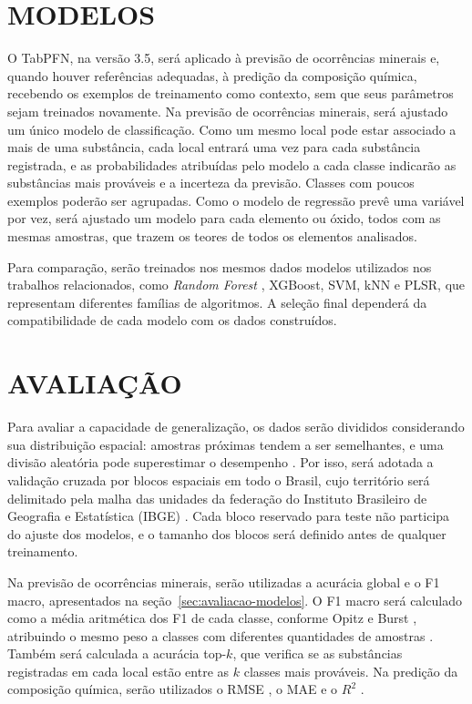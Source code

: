 \section{MODELOS}

O TabPFN, na versão 3.5, será aplicado à previsão de ocorrências minerais e, quando houver referências adequadas, à predição da composição química, recebendo os exemplos de treinamento como contexto, sem que seus parâmetros sejam treinados novamente. Na previsão de ocorrências minerais, será ajustado um único modelo de classificação. Como um mesmo local pode estar associado a mais de uma substância, cada local entrará uma vez para cada substância registrada, e as probabilidades atribuídas pelo modelo a cada classe indicarão as substâncias mais prováveis e a incerteza da previsão. Classes com poucos exemplos poderão ser agrupadas. Como o modelo de regressão prevê uma variável por vez, será ajustado um modelo para cada elemento ou óxido, todos com as mesmas amostras, que trazem os teores de todos os elementos analisados.

Para comparação, serão treinados nos mesmos dados modelos utilizados nos trabalhos relacionados, como \textit{Random Forest} \cite{breiman2001}, XGBoost, SVM, kNN e PLSR, que representam diferentes famílias de algoritmos. A seleção final dependerá da compatibilidade de cada modelo com os dados construídos.

\section{AVALIAÇÃO}

Para avaliar a capacidade de generalização, os dados serão divididos considerando sua distribuição espacial: amostras próximas tendem a ser semelhantes, e uma divisão aleatória pode superestimar o desempenho \cite{roberts2017}. Por isso, será adotada a validação cruzada por blocos espaciais em todo o Brasil, cujo território será delimitado pela malha das unidades da federação do Instituto Brasileiro de Geografia e Estatística (IBGE) \cite{ibge2025malha}. Cada bloco reservado para teste não participa do ajuste dos modelos, e o tamanho dos blocos será definido antes de qualquer treinamento.

Na previsão de ocorrências minerais, serão utilizadas a acurácia global e o F1 macro, apresentados na seção~\ref{sec:avaliacao-modelos}. O F1 macro será calculado como a média aritmética dos F1 de cada classe, conforme Opitz e Burst \cite{opitz2021}, atribuindo o mesmo peso a classes com diferentes quantidades de amostras \cite{sokolova2009}. Também será calculada a acurácia top-$k$, que verifica se as substâncias registradas em cada local estão entre as $k$ classes mais prováveis. Na predição da composição química, serão utilizados o RMSE \cite{chai2014}, o MAE \cite{willmott2005} e o $R^2$ \cite{chicco2021}.

